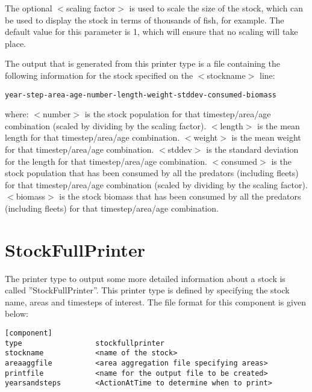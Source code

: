\documentclass [a4paper, 10pt]{book}
\begin{document}
The optional $<$scaling factor$>$ is used to scale the size of the stock, which can be used to display the stock in terms of thousands of fish, for example.  The default value for this parameter is 1, which will ensure that no scaling will take place.

\bigskip
The output that is generated from this printer type is a file containing the following information for the stock specified on the $<$stockname$>$ line:

{\small\begin{verbatim}
year-step-area-age-number-length-weight-stddev-consumed-biomass
\end{verbatim}}

where:\newline
$<$number$>$ is the stock population for that timestep/area/age combination (scaled by dividing by the scaling factor).\newline
$<$length$>$ is the mean length for that timestep/area/age combination.\newline
$<$weight$>$ is the mean weight for that timestep/area/age combination.\newline
$<$stddev$>$ is the standard deviation for the length for that timestep/area/age combination.\newline
$<$consumed$>$ is the stock population that has been consumed by all the predators (including fleets) for that timestep/area/age combination (scaled by dividing by the scaling factor).\newline
$<$biomass$>$ is the stock biomass that has been consumed by all the predators (including fleets) for that timestep/area/age combination.

\section{StockFullPrinter}\label{sec:stockfullprinter}
The printer type to output some more detailed information about a stock is called ''StockFullPrinter''.  This printer type is defined by specifying the stock name, areas and timesteps of interest.  The file format for this component is given below:

{\small\begin{verbatim}
[component]
type                 stockfullprinter
stockname            <name of the stock>
areaaggfile          <area aggregation file specifying areas>
printfile            <name for the output file to be created>
yearsandsteps        <ActionAtTime to determine when to print>
\end{verbatim}}
\end{document}
